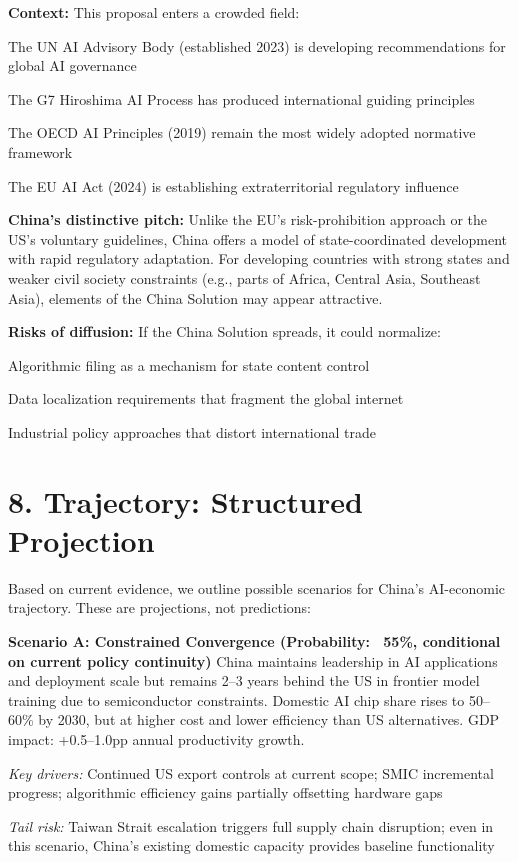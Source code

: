 \documentclass[11pt,a4paper]{article}
\begin{document}
\textbf{Context:} This proposal enters a crowded field:
\item The UN AI Advisory Body (established 2023) is developing recommendations for global AI governance
\item The G7 Hiroshima AI Process has produced international guiding principles
\item The OECD AI Principles (2019) remain the most widely adopted normative framework
\item The EU AI Act (2024) is establishing extraterritorial regulatory influence

\textbf{China's distinctive pitch:} Unlike the EU's risk-prohibition approach or the US's voluntary guidelines, China offers a model of state-coordinated development with rapid regulatory adaptation. For developing countries with strong states and weaker civil society constraints (e.g., parts of Africa, Central Asia, Southeast Asia), elements of the China Solution may appear attractive.

\textbf{Risks of diffusion:} If the China Solution spreads, it could normalize:
\item Algorithmic filing as a mechanism for state content control
\item Data localization requirements that fragment the global internet
\item Industrial policy approaches that distort international trade

\section{8. Trajectory: Structured Projection}

Based on current evidence, we outline possible scenarios for China's AI-economic trajectory. These are projections, not predictions:

\textbf{Scenario A: Constrained Convergence (Probability: ~55\%, conditional on current policy continuity)}
China maintains leadership in AI applications and deployment scale but remains 2--3 years behind the US in frontier model training due to semiconductor constraints. Domestic AI chip share rises to 50--60\% by 2030, but at higher cost and lower efficiency than US alternatives. GDP impact: +0.5--1.0pp annual productivity growth.
\item \textit{Key drivers:} Continued US export controls at current scope; SMIC incremental progress; algorithmic efficiency gains partially offsetting hardware gaps
\item \textit{Tail risk:} Taiwan Strait escalation triggers full supply chain disruption; even in this scenario, China's existing domestic capacity provides baseline functionality
\end{document}
